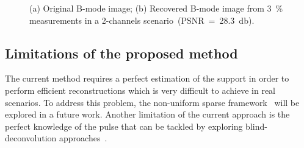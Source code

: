 \documentclass{article}
\theoremstyle{definition}
\begin{document}
\begin{figure}[htb]
	\hfill%
	\hfill%
	\hfill%
	\caption{(a) Original B-mode image; (b) Recovered B-mode image from \SI{3}{\percent} measurements in a \num{2}-channels scenario~(PSNR~=~\SI{28.3}{\decibel}).}
	\label{fig_carotid}
\end{figure}
\subsection{Limitations of the proposed method}
\label{subsec_limitations}
The current method requires a perfect estimation of the support in order to perform efficient reconstructions which is very difficult to achieve in real scenarios. To address this problem, the non-uniform sparse framework~\cite{Khajehnejad_TSP_2011} will be explored in a future work. Another limitation of the current approach is the perfect knowledge of the pulse that can be tackled by exploring blind-deconvolution approaches~\cite{Hedge_TSP_2011, Demirli2001, Zhao_IUS_2016}.
\end{document}
